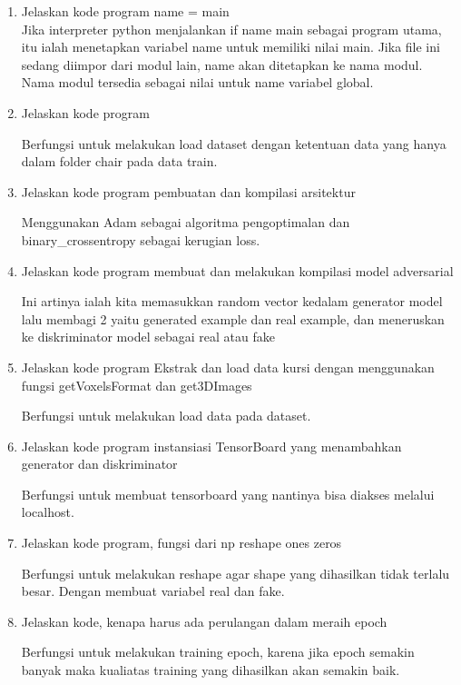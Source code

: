 \begin{enumerate}
\item Jelaskan kode program name = main
	\hfill\\
	Jika interpreter python menjalankan if name main  sebagai program utama, itu ialah menetapkan variabel name  untuk memiliki nilai main. Jika file ini sedang diimpor dari modul lain, name akan ditetapkan ke nama modul. Nama modul tersedia sebagai nilai untuk name variabel global.
		


\item Jelaskan kode program
	
	Berfungsi untuk melakukan load dataset dengan ketentuan data yang hanya dalam folder chair pada data train.

\item Jelaskan kode program pembuatan dan kompilasi arsitektur
	
	Menggunakan Adam sebagai algoritma pengoptimalan dan binary\_crossentropy sebagai kerugian loss.


\item Jelaskan kode program membuat dan melakukan kompilasi model adversarial
	
	Ini artinya ialah kita memasukkan random vector kedalam generator model lalu membagi 2 yaitu generated example dan real example, dan meneruskan ke diskriminator model sebagai real atau fake

\item Jelaskan kode program Ekstrak dan load data kursi dengan menggunakan fungsi getVoxelsFormat dan get3DImages 
	
	Berfungsi untuk melakukan load data pada dataset.
	
\item Jelaskan kode program instansiasi TensorBoard yang menambahkan generator dan diskriminator
	
	Berfungsi untuk membuat tensorboard yang nantinya bisa diakses melalui localhost.

\item Jelaskan kode program, fungsi dari np reshape ones zeros 
	
	Berfungsi untuk melakukan reshape agar shape yang dihasilkan tidak terlalu besar. Dengan membuat variabel real dan fake.

\item Jelaskan kode, kenapa harus ada perulangan dalam meraih epoch
	
	Berfungsi untuk melakukan training epoch, karena jika epoch semakin banyak maka kualiatas training yang dihasilkan akan semakin baik.


\end{enumerate}
